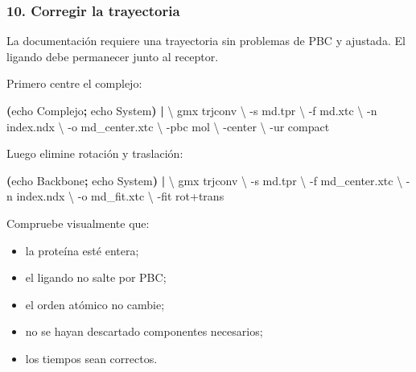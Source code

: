\documentclass[
  spanish,
  11pt,
  a4paper]{article}
\newenvironment{Shaded}{\begin{snugshade}}{\end{snugshade}}
\newcommand{\AttributeTok}[1]{\textcolor[rgb]{0.13,0.29,0.53}{#1}}
\newcommand{\BuiltInTok}[1]{#1}
\newcommand{\DataTypeTok}[1]{\textcolor[rgb]{0.13,0.29,0.53}{#1}}
\newcommand{\ExtensionTok}[1]{#1}
\newcommand{\KeywordTok}[1]{\textcolor[rgb]{0.13,0.29,0.53}{\textbf{#1}}}
\newcommand{\NormalTok}[1]{#1}
\providecommand{\tightlist}{%
  \setlength{\itemsep}{0pt}\setlength{\parskip}{0pt}}
\begin{document}
\subsubsection{10. Corregir la
trayectoria}\label{corregir-la-trayectoria}

La documentación requiere una trayectoria sin problemas de PBC y
ajustada. El ligando debe permanecer junto al receptor.

Primero centre el complejo:

\begin{Shaded}
\begin{Highlighting}[]
\KeywordTok{(}\BuiltInTok{echo}\NormalTok{ Complejo}\KeywordTok{;} \BuiltInTok{echo}\NormalTok{ System}\KeywordTok{)} \KeywordTok{|} \DataTypeTok{\textbackslash{}}
\ExtensionTok{gmx}\NormalTok{ trjconv }\DataTypeTok{\textbackslash{}}
    \AttributeTok{{-}s}\NormalTok{ md.tpr }\DataTypeTok{\textbackslash{}}
    \AttributeTok{{-}f}\NormalTok{ md.xtc }\DataTypeTok{\textbackslash{}}
    \AttributeTok{{-}n}\NormalTok{ index.ndx }\DataTypeTok{\textbackslash{}}
    \AttributeTok{{-}o}\NormalTok{ md\_center.xtc }\DataTypeTok{\textbackslash{}}
    \AttributeTok{{-}pbc}\NormalTok{ mol }\DataTypeTok{\textbackslash{}}
    \AttributeTok{{-}center} \DataTypeTok{\textbackslash{}}
    \AttributeTok{{-}ur}\NormalTok{ compact}
\end{Highlighting}
\end{Shaded}

Luego elimine rotación y traslación:

\begin{Shaded}
\begin{Highlighting}[]
\KeywordTok{(}\BuiltInTok{echo}\NormalTok{ Backbone}\KeywordTok{;} \BuiltInTok{echo}\NormalTok{ System}\KeywordTok{)} \KeywordTok{|} \DataTypeTok{\textbackslash{}}
\ExtensionTok{gmx}\NormalTok{ trjconv }\DataTypeTok{\textbackslash{}}
    \AttributeTok{{-}s}\NormalTok{ md.tpr }\DataTypeTok{\textbackslash{}}
    \AttributeTok{{-}f}\NormalTok{ md\_center.xtc }\DataTypeTok{\textbackslash{}}
    \AttributeTok{{-}n}\NormalTok{ index.ndx }\DataTypeTok{\textbackslash{}}
    \AttributeTok{{-}o}\NormalTok{ md\_fit.xtc }\DataTypeTok{\textbackslash{}}
    \AttributeTok{{-}fit}\NormalTok{ rot+trans}
\end{Highlighting}
\end{Shaded}

Compruebe visualmente que:

\begin{itemize}
\tightlist
\item
  la proteína esté entera;
\item
  el ligando no salte por PBC;
\item
  el orden atómico no cambie;
\item
  no se hayan descartado componentes necesarios;
\item
  los tiempos sean correctos.
\end{itemize}
\end{document}
